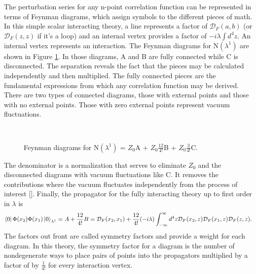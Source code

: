 The perturbation series for any n-point correlation function can be represented in terms of Feynman diagrams, which assign symbols to the different pieces of math. In this simple scalar interacting theory, a line represents a factor of $\mathcal{D}_F(a,b)$ (or $\mathcal{D}_F(z,z)$ if it's a loop) and an internal vertex provides a factor of $-i\lambda\int d^4z$. An internal vertex represents an interaction. The Feynman diagrams for N$(\lambda^1)$ are shown in Figure \ref{fig:feynfullprop}. In those diagrams, A and B are fully connected while C is disconnected. The separation reveals the fact that the pieces may be calculated independently and then multiplied. The fully connected pieces are the fundamental expressions from which any correlation function may be derived. There are two types of connected diagrams, those with external points and those with no external points. Those with zero external points represent vacuum fluctuations.
\begin{figure}[htbp]
     \centering
   \mbox{
       \qquad
       \qquad
       \qquad
     }
    \caption[Feynman diagrams for the Numerator N$(\lambda^1)$ = $Z_0$A + $Z_0$B + $Z_0$C.]
    {Feynman diagrams for N$(\lambda^1)$ = $Z_0$A + $Z_0\frac{12}{4!}$B + $Z_0\frac{3}{4!}$C.}
    \label{fig:feynfullprop}
\end{figure}
The denominator is a normalization that serves to eliminate $Z_0$ and the disconnected diagrams with vacuum fluctuations like C. It removes the contributions where the vacuum fluctuates independently from the process of interest [\cite{peskin}]. Finally, the propagator for the fully interacting theory up to first order in $\lambda$ is 
\begin{equation}
\bra{0}\Phi(x_2)\Phi(x_1)\ket{0}_{\lambda^1} = A + \frac{12}{4!}B = \mathcal{D}_F(x_2,x_1) + 
\frac{12}{4!}(-i\lambda)\int_{-\infty}^{\infty} d^4z \mathcal{D}_F(x_2,z) \mathcal{D}_F(x_1,z) \mathcal{D}_F(z,z).
\end{equation}
The factors out front are called symmetry factors and provide a weight for each diagram. In this theory, the symmetry factor for a diagram is the number of nondegenerate ways to place pairs of points into the propagators multiplied by a factor of by $\frac{1}{4!}$ for every interaction vertex. 

